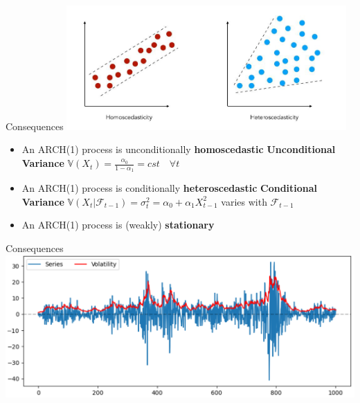 \documentclass{beamer}
\def\Var{\mathbb{V}}
\def\F{\mathcal{F}}
\begin{document}
\begin{frame}{Consequences}
\centering
\includegraphics[width=0.8\textwidth]{static/course_3_img/homo_hsk.jpeg}

  \begin{itemize}
        \item An ARCH(1) process is unconditionally \textbf{\color{red} homoscedastic}
        \textbf{Unconditional Variance} $\Var(X_t) =\frac{\alpha_0}{1-\alpha_1}= cst \quad \forall t$
        \item An ARCH(1) process is conditionally \textbf{\color{red} heteroscedastic}
        \textbf{Conditional Variance} $\Var(X_t|\F_{t-1}) =\sigma_t^2 = \alpha_0 + \alpha_1 X_{t-1}^2$ varies with $\F_{t-1}$
        \item An ARCH(1) process is (weakly) \textbf{\color{red}stationary}
\end{itemize}
\end{frame}
\begin{frame}{Consequences}
\centering
\includegraphics[width=.9\textwidth]{static/course_3_img/simulated_garch22.png}    
\end{frame}
\end{document}
